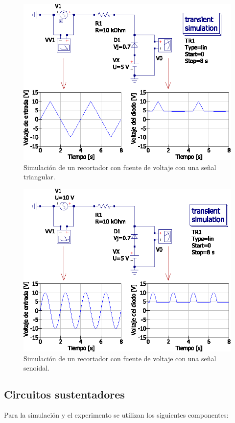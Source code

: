 \documentclass[letter,twoside,11pt]{article}
\begin{document}
\begin{figure}[!h]
\centering
\includegraphics[scale=0.97]{simulacion/practica1.6.eps}
\caption{Simulación de un recortador con fuente de voltaje con una señal
triangular.}
\label{simulacion6}
\end{figure}

\begin{figure}[!h]
\centering
\includegraphics[scale=0.97]{simulacion/practica1.7.eps}
\caption{Simulación de un recortador con fuente de voltaje con una señal
senoidal.}
\label{simulacion7}
\end{figure}

\subsection{Circuitos sustentadores}
Para la simulación y el experimento se utilizan los siguientes componentes:
\end{document}

